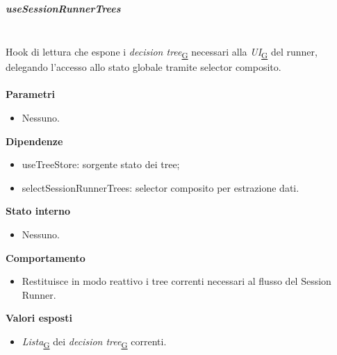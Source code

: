 \documentclass[a4paper,12pt]{article}
\begin{document}
                \subparagraph{useSessionRunnerTrees}\mbox{}\\
                Hook di lettura che espone i \textit{decision tree}\textsubscript{\href{https://atlasteam9.github.io/Atlas/glossario.html\#DecisionTree}{G}} necessari alla \textit{UI}\textsubscript{\href{https://atlasteam9.github.io/Atlas/glossario.html\#UI}{G}} del runner, delegando l'accesso allo stato globale tramite selector composito.\\\\
                \textbf{Parametri}
                \begin{itemize}
                    \item Nessuno.
                \end{itemize}
                \textbf{Dipendenze}
                \begin{itemize}
                    \item {\ttfamily useTreeStore}: sorgente stato dei tree;
                    \item {\ttfamily selectSessionRunnerTrees}: selector composito per estrazione dati.
                \end{itemize}
                \textbf{Stato interno}
                \begin{itemize}
                    \item Nessuno.
                \end{itemize}
                \textbf{Comportamento}
                \begin{itemize}
                    \item Restituisce in modo reattivo i tree correnti necessari al flusso del Session Runner.
                \end{itemize}
                \textbf{Valori esposti}
                \begin{itemize}
                    \item \textit{Lista}\textsubscript{\href{https://atlasteam9.github.io/Atlas/glossario.html\#Lista}{G}} dei \textit{decision tree}\textsubscript{\href{https://atlasteam9.github.io/Atlas/glossario.html\#DecisionTree}{G}} correnti.
                \end{itemize}
                
\end{document}
